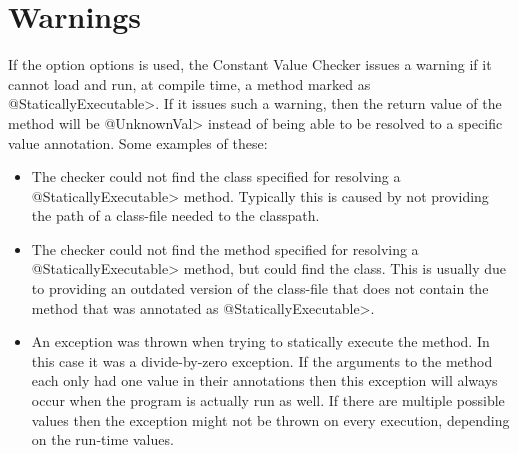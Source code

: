 \section{Warnings\label{value-checker-warnings}}

If the option  options is used, the Constant Value Checker issues a warning if it cannot load and run, at
compile time, a method marked as \<@StaticallyExecutable>.  If it issues
such a warning, then the return value of the method will be \<@UnknownVal>
instead of being able to be resolved to a specific value annotation.
Some examples of these:

\begin{sloppypar}
\begin{itemize}
\item {}

  The checker could not find the class
  specified for resolving a \<@StaticallyExecutable> method. Typically
  this is caused by not providing the path of a class-file needed to
  the classpath.

\item {}

  The checker could not find the method  specified for
  resolving a \<@StaticallyExecutable> method, but could find the
  class. This is usually due to providing an outdated version of the
  class-file that does not contain the
  method that was annotated as \<@StaticallyExecutable>.

\item {}

  An exception was thrown when trying to statically execute the
  method. In this case it was a divide-by-zero exception. If the
  arguments to the method each only had one value in their annotations
  then this exception will always occur when the program is actually
  run as well. If there are multiple possible values then the exception
  might not be thrown on every execution, depending on the run-time values.

\end{itemize}
\end{sloppypar}

